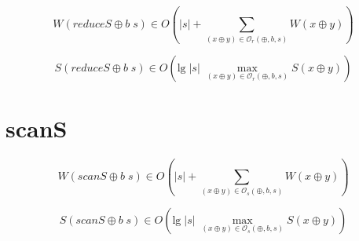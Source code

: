 \documentclass[a4paper,10pt]{article}
\begin{document}
\begin{equation*}
    W \left( reduceS \oplus b \; s \right) \in
    O \left( \vert s \vert + \sum_{(x \oplus y) \in \mathcal{O}_r(\oplus,b,s)} W(x \oplus y) \right)
\end{equation*}

\begin{equation*}
    S \left( reduceS \oplus b \; s \right) \in
    O \left( \text{lg} \; \vert s \vert \; \max_{(x \oplus y) \in \mathcal{O}_r(\oplus,b,s)} S(x \oplus y) \right)
\end{equation*}

\section*{scanS}

\begin{equation*}
    W \left( scanS \oplus b \; s \right) \in
    O \left( \vert s \vert + \sum_{(x \oplus y) \in \mathcal{O}_s(\oplus,b,s)} W(x \oplus y) \right)
\end{equation*}

\begin{equation*}
    S \left( scanS \oplus b \; s \right) \in
    O \left( \text{lg} \; \vert s \vert \; \max_{(x \oplus y) \in \mathcal{O}_s(\oplus,b,s)} S(x \oplus y) \right)
\end{equation*}
\end{document}

